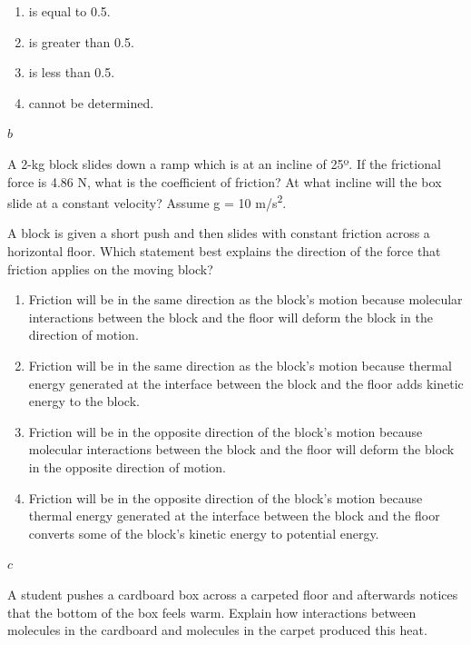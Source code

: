 \documentclass[
]{book}
\providecommand{\tightlist}{%
  \setlength{\itemsep}{0pt}\setlength{\parskip}{0pt}}
\begin{document}
\begin{enumerate}
\def\labelenumi{\alph{enumi}.}
\tightlist
\item
  is equal to 0.5.
\item
  is greater than 0.5.
\item
  is less than 0.5.
\item
  cannot be determined.
\end{enumerate}

\leavevmode{}%
\(b\)

\hypertarget{import-auto-id0000013}{}
\leavevmode{}%
A 2-kg block slides down a ramp which is at an incline of 25º. If the
frictional force is 4.86 N, what is the coefficient of friction? At what
incline will the box slide at a constant velocity? Assume g = 10 m/s\textsuperscript{2}.

\hypertarget{import-auto-id0000018}{}
\leavevmode{}%
A block is given a short push and then slides with constant friction
across a horizontal floor. Which statement best explains the direction
of the force that friction applies on the moving block?

\begin{enumerate}
\def\labelenumi{\alph{enumi}.}
\tightlist
\item
  Friction will be in the same direction as the block's motion
  because molecular interactions between the block and the floor will
  deform the block in the direction of motion.
\item
  Friction will be in the same direction as the block's motion
  because thermal energy generated at the interface between the block
  and the floor adds kinetic energy to the block.
\item
  Friction will be in the opposite direction of the block's motion
  because molecular interactions between the block and the floor will
  deform the block in the opposite direction of motion.
\item
  Friction will be in the opposite direction of the block's motion
  because thermal energy generated at the interface between the block
  and the floor converts some of the block's kinetic energy to
  potential energy.
\end{enumerate}

\leavevmode{}%
\(c\)

\hypertarget{import-auto-id0000024}{}
\leavevmode{}%
A student pushes a cardboard box across a carpeted floor and afterwards
notices that the bottom of the box feels warm. Explain how interactions
between molecules in the cardboard and molecules in the carpet produced
this heat.
\end{document}
